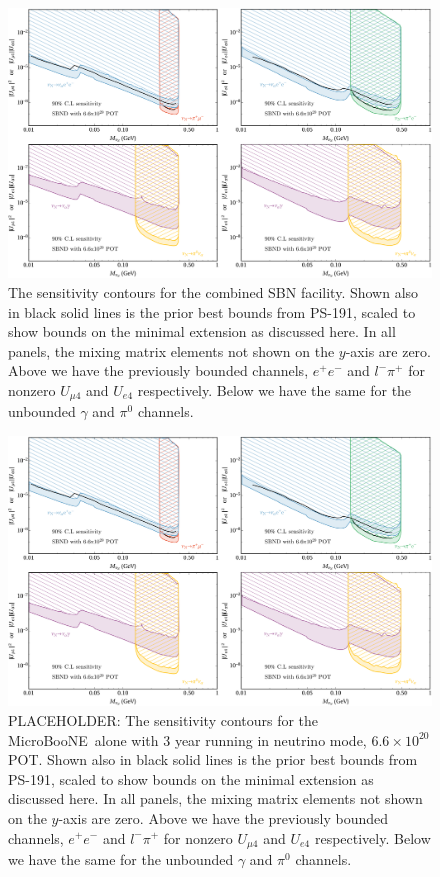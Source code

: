 \documentclass[11pt, a4paper]{article}
\def\muboone{MicroBooNE}
\begin{document}
\begin{figure}[t]
\center
\includegraphics[width=1.0\textwidth]{figures/band_sbn.pdf}

\caption{\label{fig:band_sbn}The sensitivity contours for the combined SBN
facility. Shown also in black solid lines is the prior best bounds from PS-191,
scaled to show bounds on the minimal extension as discussed here. In all
panels, the mixing matrix elements not shown on the $y$-axis are zero. Above we
have the previously bounded channels, $e^+e^-$ and $l^- \pi^+$ for nonzero
$U_{\mu 4}$ and $U_{e4}$ respectively. Below we have the same for the unbounded
$\gamma$ and $\pi^0$ channels.}

\end{figure}

\begin{figure}[t]
\center
\includegraphics[width=1.0\textwidth]{figures/band_sbn.pdf}

\caption{\label{fig:band_muboone} PLACEHOLDER: The sensitivity contours for the
\muboone\ alone with  3 year running in neutrino mode, $6.6\times 10^{20}$
POT. Shown also in black solid lines is the prior best bounds from PS-191,
scaled to show bounds on the minimal extension as discussed here. In all
panels, the mixing matrix elements not shown on the $y$-axis are zero. Above we
have the previously bounded channels, $e^+e^-$ and $l^- \pi^+$ for nonzero
$U_{\mu 4}$ and $U_{e4}$ respectively. Below we have the same for the unbounded
$\gamma$ and $\pi^0$ channels.}

\end{figure}
\end{document}

